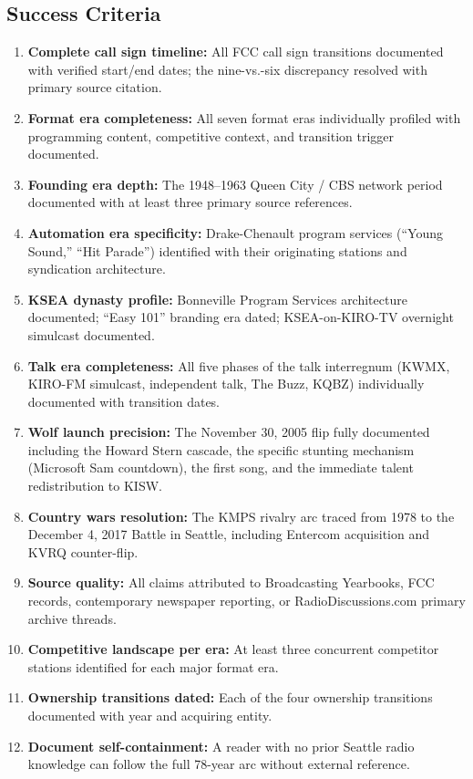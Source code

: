 \documentclass[11pt,letterpaper]{article}
\begin{document}
\subsection{Success Criteria}

\begin{enumerate}[leftmargin=2em]
  \item \textbf{Complete call sign timeline:} All FCC call sign transitions documented with verified start/end dates; the nine-vs.-six discrepancy resolved with primary source citation.
  \item \textbf{Format era completeness:} All seven format eras individually profiled with programming content, competitive context, and transition trigger documented.
  \item \textbf{Founding era depth:} The 1948--1963 Queen City / CBS network period documented with at least three primary source references.
  \item \textbf{Automation era specificity:} Drake-Chenault program services (``Young Sound,'' ``Hit Parade'') identified with their originating stations and syndication architecture.
  \item \textbf{KSEA dynasty profile:} Bonneville Program Services architecture documented; ``Easy 101'' branding era dated; KSEA-on-KIRO-TV overnight simulcast documented.
  \item \textbf{Talk era completeness:} All five phases of the talk interregnum (KWMX, KIRO-FM simulcast, independent talk, The Buzz, KQBZ) individually documented with transition dates.
  \item \textbf{Wolf launch precision:} The November 30, 2005 flip fully documented including the Howard Stern cascade, the specific stunting mechanism (Microsoft Sam countdown), the first song, and the immediate talent redistribution to KISW.
  \item \textbf{Country wars resolution:} The KMPS rivalry arc traced from 1978 to the December 4, 2017 Battle in Seattle, including Entercom acquisition and KVRQ counter-flip.
  \item \textbf{Source quality:} All claims attributed to Broadcasting Yearbooks, FCC records, contemporary newspaper reporting, or RadioDiscussions.com primary archive threads.
  \item \textbf{Competitive landscape per era:} At least three concurrent competitor stations identified for each major format era.
  \item \textbf{Ownership transitions dated:} Each of the four ownership transitions documented with year and acquiring entity.
  \item \textbf{Document self-containment:} A reader with no prior Seattle radio knowledge can follow the full 78-year arc without external reference.
\end{enumerate}
\end{document}
